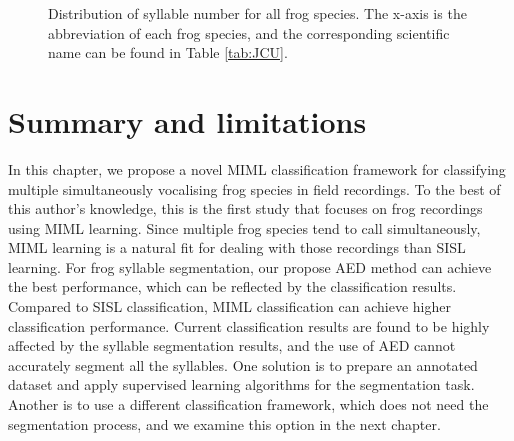 \begin{figure}[htb!] %
\caption[Distribution of syllable number for all frog species]{Distribution of syllable number for all frog species. The x-axis is the abbreviation of each frog species, and the corresponding scientific name can be found in Table \ref{tab:JCU}.}
\label{fig:Ch6_syllable} 
\end{figure}

\section{Summary and limitations}
In this chapter, we propose a novel MIML classification framework for classifying multiple simultaneously vocalising frog species in field recordings. To the best of this author's knowledge, this is the first study that focuses on frog recordings using MIML learning. Since multiple frog species tend to call simultaneously, MIML learning is a natural fit for dealing with those recordings than SISL learning. For frog syllable segmentation, our propose AED method can achieve the best performance, which can be reflected by the classification results. Compared to SISL classification, MIML classification can achieve higher classification performance. Current classification results are found to be highly affected by the syllable segmentation results, and the use of AED cannot accurately segment all the syllables. One solution is to prepare an annotated dataset and apply supervised learning algorithms for the segmentation task. Another is to use a different classification framework, which does not need the segmentation process, and we examine this option in the next chapter.



